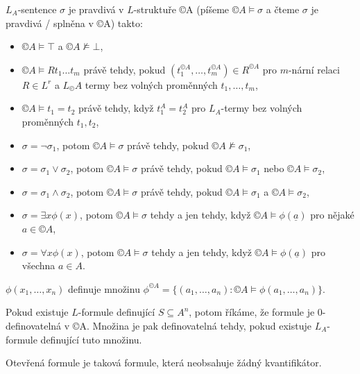 \documentclass[12pt]{article}                   %
\begin{document}
        \begin{definice}
            $L_A$-sentence $\sigma$ je pravdivá v $L$-struktuře ©A (píšeme $©A \models \sigma$ a čteme $\sigma$ je pravdivá / splněna v ©A) takto:

            \begin{itemize}
                \item $©A \models \top$ a $©A \not\models \bot$,
                \item $©A \models Rt_1…t_m$ právě tehdy, pokud $(t^{©A}_1, …, t^{©A}_m) \in R^{©A}$ pro $m$-nární relaci $R \in L^r$ a $L_©A$ termy bez volných proměnných $t_1, …, t_m$,
                \item $©A \models t_1 = t_2$ právě tehdy, když $t_1^A = t_2^A$ pro $L_A$-termy bez volných proměnných $t_1, t_2$,
                \item $\sigma = \neg \sigma_1$, potom $©A \models \sigma$ právě tehdy, pokud $©A \not\models \sigma_1$,
                \item $\sigma = \sigma_1 \lor \sigma_2$, potom $©A \models \sigma$ právě tehdy, pokud $©A \models \sigma_1$ nebo $©A \models \sigma_2$,
                \item $\sigma = \sigma_1 \land \sigma_2$, potom $©A \models \sigma$ právě tehdy, pokud $©A \models \sigma_1$ a $©A \models \sigma_2$,
                \item $\sigma = \exists x \phi(x)$, potom $©A \models \sigma$ tehdy a jen tehdy, když $©A \models \phi(\underline{a})$ pro nějaké $a \in ©A$,
                \item $\sigma = \forall x \phi(x)$, potom $©A \models \sigma$ tehdy a jen tehdy, když $©A \models \phi(\underline{a})$ pro všechna $a \in A$.
            \end{itemize}
        \end{definice}

        \begin{definice}
            $\phi(x_1, …, x_n)$ definuje množinu $\phi^{©A} = \{(a_1, …, a_n) : ©A \models \phi(a_1, …, a_n)\}$.

            Pokud existuje $L$-formule definující $S \subseteq A^n$, potom říkáme, že formule je 0-definovatelná v ©A. Množina je pak definovatelná tehdy, pokud existuje $L_A$-formule definující tuto množinu.
        \end{definice}

        \begin{definice}
            Otevřená formule je taková formule, která neobsahuje žádný kvantifikátor.
        \end{definice}
\end{document}
